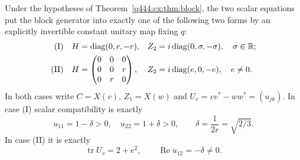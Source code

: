 \begin{lemma}\label{q444:cx:lem:scalar}
Under the hypotheses of Theorem~\ref{q444:cx:thm:block}, the two scalar
equations put the block generator into exactly one of the following
two forms by an explicitly invertible constant unitary map fixing $q$:
\begin{align*}
 \textnormal{(I)}\quad&H=\operatorname{diag}(0,r,-r),
      &&Z_2=i\operatorname{diag}(0,\sigma,-\sigma),\quad\sigma\in\mathbb R;\\
 \textnormal{(II)}\quad&H=\begin{pmatrix}0&0&0\\0&0&r\\0&r&0\end{pmatrix},
      &&Z_2=i\operatorname{diag}(e,0,-e),\quad e\ne0.
\end{align*}
In both cases write $C=X(v)$, $Z_1=X(w)$ and
$U_v=vv^*-ww^*=(u_{jk})$. In case (I) scalar compatibility is exactly
\[
 u_{11}=1-\delta>0,\quad u_{22}=1+\delta>0,
 \qquad\delta=\frac1{2r}=\sqrt{2/3}.
\]
In case (II) it is exactly
\[
 \operatorname{tr} U_v=2+e^2,\qquad \operatorname{Re}u_{12}=-\delta\ne0.
\]
\end{lemma}
